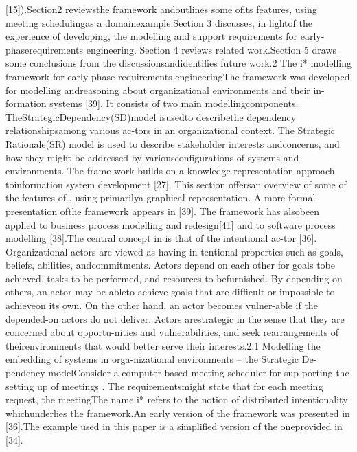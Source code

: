 [15]).Section2 reviewsthe framework andoutlines some ofits features, using meeting schedulingas a domainexample.Section 3 discusses, in lightof the experience of developing, the modelling and support requirements for early-phaserequirements engineering. Section 4 reviews related work.Section 5 draws some conclusions from the discussionsandidentiﬁes future work.2 The i* modelling framework for early-phase requirements engineeringThe framework was developed for modelling andreasoning about organizational environments and their in-formation systems [39]. It consists of two main modellingcomponents. TheStrategicDependency(SD)model isusedto describethe dependency relationshipsamong various ac-tors in an organizational context. The Strategic Rationale(SR) model is used to describe stakeholder interests andconcerns, and how they might be addressed by variousconﬁgurations of systems and environments. The frame-work builds on a knowledge representation approach toinformation system development [27]. This section offersan overview of some of the features of , using primarilya graphical representation. A more formal presentation ofthe framework appears in [39]. The framework has alsobeen applied to business process modelling and redesign[41] and to software process modelling [38].The central concept in is that of the intentional ac-tor [36]. Organizational actors are viewed as having in-tentional properties such as goals, beliefs, abilities, andcommitments. Actors depend on each other for goals tobe achieved, tasks to be performed, and resources to befurnished. By depending on others, an actor may be ableto achieve goals that are difﬁcult or impossible to achieveon its own. On the other hand, an actor becomes vulner-able if the depended-on actors do not deliver. Actors arestrategic in the sense that they are concerned about opportu-nities and vulnerabilities, and seek rearrangements of theirenvironments that would better serve their interests.2.1 Modelling the embedding of systems in orga-nizational environments – the Strategic De-pendency modelConsider a computer-based meeting scheduler for sup-porting the setting up of meetings . The requirementsmight state that for each meeting request, the meetingThe name i* refers to the notion of distributed intentionality whichunderlies the framework.An early version of the framework was presented in [36].The example used in this paper is a simpliﬁed version of the oneprovided in [34].
